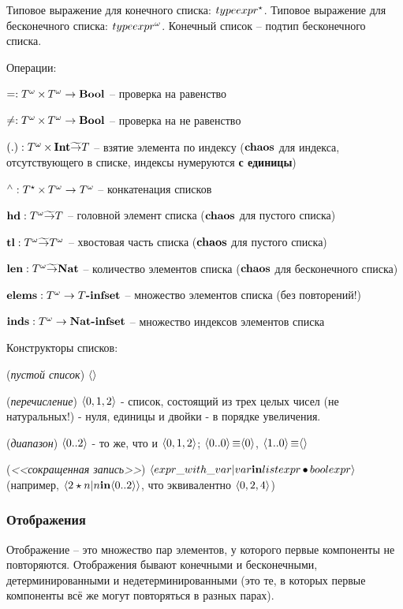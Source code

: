 \documentclass[14pt, twoside]{extreport}
\newcommand{\head}[1]{\vspace{1cm}\subsubsection*{#1}}
\begin{document}
Типовое выражение для конечного списка: $typeexpr^{\star}$. Типовое выражение для бесконечного списка: $typeexpr^{\omega}$. Конечный список -- подтип бесконечного списка.

Операции:
\begin{list}{}{}
\item $=: T^{\omega} \mathop{\times} T^{\omega} \rightarrow \textbf{Bool}$ -- проверка на равенство
\item $\neq: T^{\omega} \mathop{\times} T^{\omega} \rightarrow \textbf{Bool}$ -- проверка на не равенство
\item $(.) : T^{\omega} \mathop{\times} \textbf{Int} \widetilde{\rightarrow} T$ -- взятие элемента по
индексу ($\textbf{chaos}$ для индекса, отсутствующего в списке, индексы
нумеруются \textbf{с единицы})
\item $\mathop{{ }^\wedge}: T^{\star} \mathop{\times} T^{\omega} \rightarrow T^{\omega}$ -- конкатенация списков
\item $\mathop{\textbf{hd}}: T^{\omega} \widetilde{\rightarrow} T$ -- головной элемент списка ($\textbf{chaos}$ для пустого списка)
\item $\mathop{\textbf{tl}}: T^{\omega} \widetilde{\rightarrow} T^{\omega}$ -- хвостовая часть списка ($\textbf{chaos}$ для пустого списка)
\item $\mathop{\textbf{len}}: T^{\omega} \widetilde{\rightarrow} \textbf{Nat}$ -- количество элементов списка ($\textbf{chaos}$ для бесконечного списка)
\item $\mathop{\textbf{elems}}: T^{\omega} \rightarrow T\textbf{-infset}$ -- множество элементов списка (без повторений!)
\item $\mathop{\textbf{inds}}: T^{\omega} \rightarrow \textbf{Nat}\textbf{-infset}$ -- множество индексов элементов списка
\end{list}

Конструкторы списков:
\begin{list}{}{}
\item (\emph{пустой список}) $\langle\rangle$
\item (\emph{перечисление}) $\langle 0, 1, 2 \rangle$ - список, состоящий из трех целых чисел (не натуральных!) - нуля, единицы и двойки - в порядке увеличения.
\item (\emph{диапазон}) $\langle 0..2 \rangle$ -  то же, что и $\langle 0, 1, 2 \rangle$; $\langle 0..0 \rangle \mathop{\equiv} \langle 0 \rangle$, $\langle 1..0 \rangle \mathop{\equiv} \langle\rangle$
\item (\emph{<<сокращенная запись>>}) $\langle expr\_with\_var | var \textbf{in} listexpr \mathop{\bullet} boolexpr\rangle$ (например, $\langle 2 \star n | n \textbf{in} \langle 0..2 \rangle \rangle$, что эквивалентно $\langle 0, 2, 4 \rangle$)
\end{list}


\head{Отображения}
Отображение -- это множество пар элементов, у которого первые компоненты не повторяются. Отображения бывают конечными и бесконечными, детерминированными и недетерминированными (это те, в которых первые компоненты всё же могут повторяться в разных парах).
\end{document}
